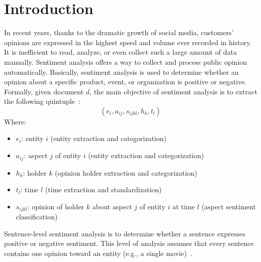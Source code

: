 \section{Introduction}
In recent years, thanks to the dramatic growth of social media, customers' opinions are expressed in the highest speed and volume ever recorded in history.
It is inefficient to read, analyze, or even collect such a large amount of data manually. 
Sentiment analysis offers a way to collect and process public opinion automatically.
Basically, sentiment analysis is used to determine whether an opinion about a specific product, event, or organization is positive or negative. 
Formally, given document $d$, the main objective of sentiment analysis is to extract the following quintuple~\cite{liu2012sentiment}:
\[ ( e_{i}, a_{ij}, s_{ijkl}, h_{k}, t_{l} ) \]
Where:
\begin{itemize}
	\item $e_{i}$: entity \(i\) (entity extraction and categorization)
	\item $a_{ij}$: aspect \(j\) of entity \(i\) (entity extraction and categorization)
	\item $h_{k}$: holder \(k\) (opinion holder extraction and categorization)
	\item $t_{l}$: time \(l\) (time extraction and standardization)
	\item $s_{ijkl}$: opinion of holder \(k\) about aspect \(j\) of entity \(i\) at time \(l\) (aspect sentiment classification)
\end{itemize}
Sentence-level sentiment analysis is to determine whether a sentence expresses positive or negative sentiment. 
This level of analysis assumes that every sentence contains one opinion toward an entity (e.g., a single movie)~\cite{liu2012sentiment}.


